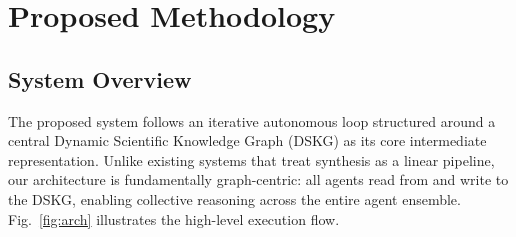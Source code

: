 \section{Proposed Methodology}

\subsection{System Overview}

The proposed system follows an iterative autonomous loop structured around a central Dynamic Scientific Knowledge Graph (DSKG) as its core intermediate representation. Unlike existing systems that treat synthesis as a linear pipeline, our architecture is fundamentally graph-centric: all agents read from and write to the DSKG, enabling collective reasoning across the entire agent ensemble. Fig.~\ref{fig:arch} illustrates the high-level execution flow.

